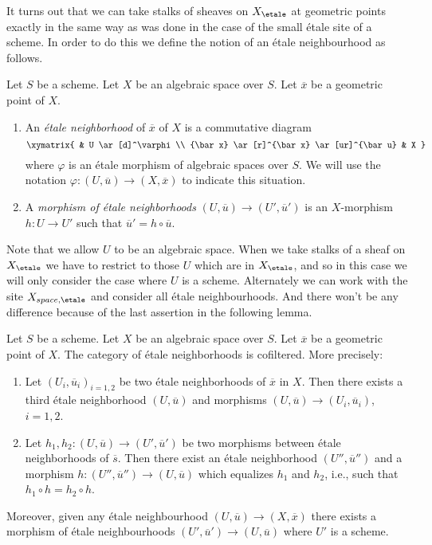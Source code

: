 \noindent
It turns out that we can take stalks of sheaves on $X_\etale$
at geometric points exactly in the same way as was done in the
case of the small \'etale site of a scheme. In order to do this we
define the notion of an \'etale neighbourhood as follows.

\begin{definition}
\label{definition-etale-neighbourhood}
Let $S$ be a scheme. Let $X$ be an algebraic space over $S$.
Let $\overline{x}$ be a geometric point of $X$.
\begin{enumerate}
\item An {\it \'etale neighborhood} of $\overline{x}$
of $X$ is a commutative diagram
$$
\xymatrix{
& U \ar[d]^\varphi \\
{\bar x} \ar[r]^{\bar x} \ar[ur]^{\bar u} & X
}
$$
where $\varphi$ is an \'etale morphism of algebraic spaces over $S$.
We will use the notation $\varphi : (U, \overline{u}) \to (X, \overline{x})$
to indicate this situation.
\item A {\it morphism of \'etale neighborhoods}
$(U, \overline{u}) \to (U', \overline{u}')$
is an $X$-morphism $h : U \to U'$
such that $\overline{u}' = h \circ \overline{u}$.
\end{enumerate}
\end{definition}

\noindent
Note that we allow $U$ to be an algebraic space. When we take stalks
of a sheaf on $X_\etale$ we have to restrict to those $U$ which
are in $X_\etale$, and so in this case we will only consider the case
where $U$ is a scheme. Alternately we can work with the site
$X_{space, \etale}$ and consider all \'etale neighbourhoods. And there
won't be any difference because of the last assertion in the following lemma.

\begin{lemma}
\label{lemma-cofinal-etale}
Let $S$ be a scheme. Let $X$ be an algebraic space over $S$.
Let $\overline{x}$ be a geometric point of $X$.
The category of \'etale neighborhoods is cofiltered. More precisely:
\begin{enumerate}
\item Let $(U_i, \overline{u}_i)_{i = 1, 2}$ be two \'etale neighborhoods of
$\overline{x}$ in $X$. Then there exists a third \'etale neighborhood
$(U, \overline{u})$ and morphisms
$(U, \overline{u}) \to (U_i, \overline{u}_i)$, $i = 1, 2$.
\item Let $h_1, h_2: (U, \overline{u}) \to (U', \overline{u}')$ be two
morphisms between \'etale neighborhoods of $\overline{s}$. Then there exist an
\'etale neighborhood $(U'', \overline{u}'')$ and a morphism
$h : (U'', \overline{u}'') \to (U, \overline{u})$
which equalizes $h_1$ and $h_2$, i.e., such that
$h_1 \circ h = h_2 \circ h$.
\end{enumerate}
Moreover, given any \'etale neighbourhood
$(U, \overline{u}) \to (X, \overline{x})$
there exists a morphism of \'etale neighbourhoods
$(U', \overline{u}') \to (U, \overline{u})$
where $U'$ is a scheme.
\end{lemma}

